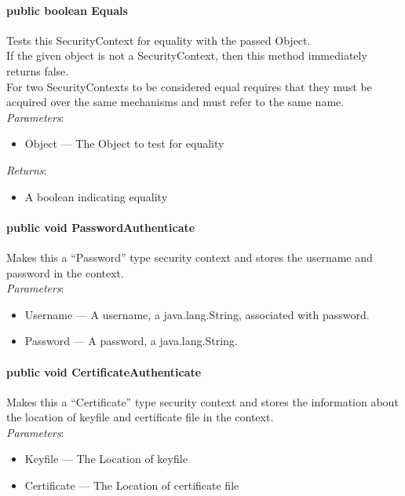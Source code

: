 \documentclass[$Date: 2003/06/26 19:29:31 $]{glabarticle}
\begin{document}
\paragraph{public boolean Equals}

Tests this SecurityContext for equality with the passed Object. \\

 If the given object is not a SecurityContext, then this method immediately
 returns false. \\

 For two SecurityContexts to be considered equal requires that they must be acquired over 
 the same mechanisms and must refer to the same name. \\
 
 \textit{Parameters}:
\begin{itemize}
\item[] Object --- The Object to test for equality 
\end{itemize}

\textit{Returns}:
\begin{itemize}
\item[] A boolean indicating equality
\end{itemize}

\paragraph{public void PasswordAuthenticate}

Makes this a ``Password'' type security context and stores the
username and password in the context. \\

\textit{Parameters}:
\begin{itemize}
\item[] Username --- A username, a java.lang.String,  associated with password.
\item[] Password --- A password, a java.lang.String.
\end{itemize}

\paragraph{public void CertificateAuthenticate}

Makes this a ``Certificate'' type security context and stores the
information about the location of keyfile and certificate file in the context.\\

\textit{Parameters}:
\begin{itemize}
\item[] Keyfile --- The Location of keyfile
\item[] Certificate --- The Location of certificate file
\end{itemize}
\end{document}
